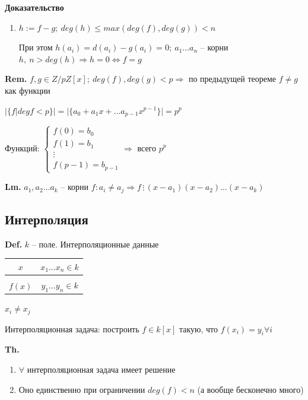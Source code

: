 \documentclass[14pt, letter paper]{article}
\begin{document}
\begin{center}
    \textbf{Доказательство}
\end{center}

\begin{enumerate}
    \item $h := f - g;\ deg(h) \leq max(deg(f), deg(g)) < n$

    При этом $h(a_i) = d(a_i) - g(a_i) = 0;\ a_1 \ldots a_n$ -- корни $h,\ n > deg(h) \Rightarrow h = 0 \Leftrightarrow f = g$
\end{enumerate}

\textbf{Rem.} $f, g \in Z/pZ[x];\ deg(f), deg(g) < p \Rightarrow$ по предыдущей теореме $f \neq g$ как функции

$|\{f | deg{f} < p\}| = |\{a_0 + a_1x + \ldots a_{p-1}x^{p-1}\}| = p^p$

Функций: $\begin{cases}
    f(0) = b_0 \\
    f(1) = b_1 \\
    \vdots \\
    f(p-1) = b_{p-1}
\end{cases} \Rightarrow$ всего $p^p$

\textbf{Lm.} $a_1, a_2 \ldots a_k$ -- корни $f : a_i \neq a_j \Rightarrow f \, \vdots \, (x-a_1)(x-a_2)\ldots(x-a_k)$

\begin{center}
    \section*{Интерполяция}
\end{center}

\textbf{Def.} $k$ -- поле. Интерполяционные данные \begin{tabular}{c|c}
    $x$ & $x_1 \ldots x_n \in k$ \\
    \hline \\
    $f(x)$ & $y_1 \ldots y_n \in k$
\end{tabular} $x_i \neq x_j$

Интерполяционная задача: построить $f \in k[x]$ такую, что $f(x_i) = y_i \forall i$

\vspace{3mm}

\textbf{Th.} \begin{enumerate}
    \item $\forall$ интерполяционная задача имеет решение

    \item Оно единственно при ограничении $deg(f) < n$ (а вообще бесконечно много)
\end{enumerate}
\end{document}
